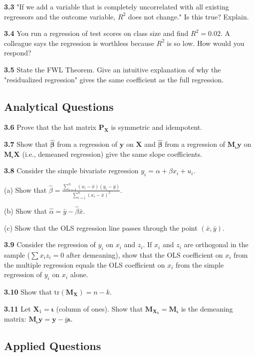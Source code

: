 \textbf{3.3} "If we add a variable that is completely uncorrelated with all existing regressors and the outcome variable, $R^2$ does not change." Is this true? Explain.

\textbf{3.4} You run a regression of test scores on class size and find $R^2 = 0.02$. A colleague says the regression is worthless because $R^2$ is so low. How would you respond?

\textbf{3.5} State the FWL Theorem. Give an intuitive explanation of why the "residualized regression" gives the same coefficient as the full regression.

\subsection{Analytical Questions}

\textbf{3.6} Prove that the hat matrix $\mathbf{P_X}$ is symmetric and idempotent.

\textbf{3.7} Show that $\hat{\boldsymbol{\beta}}$ from a regression of $\mathbf{y}$ on $\mathbf{X}$ and $\hat{\boldsymbol{\beta}}$ from a regression of $\mathbf{M_\iota}\mathbf{y}$ on $\mathbf{M_\iota}\mathbf{X}$ (i.e., demeaned regression) give the same slope coefficients.

\textbf{3.8} Consider the simple bivariate regression $y_i = \alpha + \beta x_i + u_i$. 

(a) Show that $\hat{\beta} = \frac{\sum_{i=1}^n (x_i - \bar{x})(y_i - \bar{y})}{\sum_{i=1}^n (x_i - \bar{x})^2}$.

(b) Show that $\hat{\alpha} = \bar{y} - \hat{\beta}\bar{x}$.

(c) Show that the OLS regression line passes through the point $(\bar{x}, \bar{y})$.

\textbf{3.9} Consider the regression of $y_i$ on $x_i$ and $z_i$. If $x_i$ and $z_i$ are orthogonal in the sample ($\sum x_i z_i = 0$ after demeaning), show that the OLS coefficient on $x_i$ from the multiple regression equals the OLS coefficient on $x_i$ from the simple regression of $y_i$ on $x_i$ alone.

\textbf{3.10} Show that $\text{tr}(\mathbf{M_X}) = n - k$.

\textbf{3.11} Let $\mathbf{X}_1 = \boldsymbol{\iota}$ (column of ones). Show that $\mathbf{M_{X_1}} = \mathbf{M_\iota}$ is the demeaning matrix: $\mathbf{M_\iota}\mathbf{y} = \mathbf{y} - \bar{y}\boldsymbol{\iota}$.

\subsection{Applied Questions}

